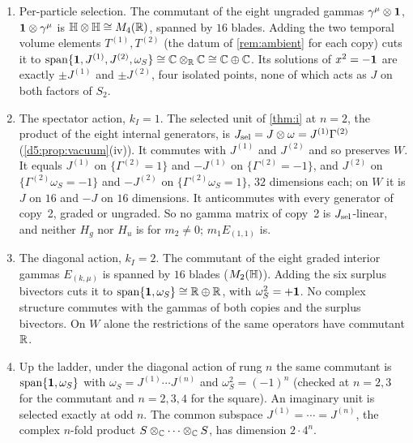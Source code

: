 \begin{proposition}
\label{e1:prop:select}
\begin{enumerate}[label=(\roman*),leftmargin=2.2em]
\item Per-particle selection. The commutant of the eight ungraded gammas $\gamma^\mu\otimes\mathbf 1$, $\mathbf 1\otimes\gamma^\mu$ is $\mathbb{H}\otimes\mathbb{H}\cong M_4(\mathbb{R})$,
spanned by $16$ blades. Adding the two temporal volume elements $T^{(1)},T^{(2)}$ (the datum of \cref{rem:ambient} for each copy)
cuts it to $\operatorname{span}\{\mathbf 1,J^{(1)},J^{(2)},\omega_S\}\cong\mathbb{C}\otimes_{\mathbb{R}}\mathbb{C}\cong\mathbb{C}\oplus\mathbb{C}$. Its solutions of $x^2=-\mathbf 1$ are exactly
$\pm J^{(1)}$ and $\pm J^{(2)}$, four isolated points, none of which acts as $J$ on both factors of $S_2$.
\item The spectator action, $k_I=1$. The selected unit of \cref{thm:i} at $n=2$, the product of the eight internal generators, is
$J_{\rm sel}=J\otimes\omega=J^{(1)}\Gamma^{(2)}$ (\cref{d5:prop:vacuum}(iv)). It commutes with $J^{(1)}$ and $J^{(2)}$ and so preserves
$W$. It equals $J^{(1)}$ on $\{\Gamma^{(2)}=1\}$ and $-J^{(1)}$ on $\{\Gamma^{(2)}=-1\}$, and $J^{(2)}$ on $\{\Gamma^{(2)}\omega_S=-1\}$ and
$-J^{(2)}$ on $\{\Gamma^{(2)}\omega_S=1\}$, $32$ dimensions each; on $W$ it is $J$ on $16$ and $-J$ on $16$ dimensions. It anticommutes with every generator of copy~2, graded or ungraded. So no gamma matrix of copy~2 is $J_{\rm sel}$-linear,
and neither $H_g$ nor $H_u$ is for $m_2\neq0$; $m_1E_{(1,1)}$ is.
\item The diagonal action, $k_I=2$. The commutant of the eight graded interior gammas $E_{(k,\mu)}$ is spanned by $16$ blades ($M_2(\mathbb{H})$). Adding
the six surplus bivectors cuts it to $\operatorname{span}\{\mathbf 1,\omega_S\}\cong\mathbb{R}\oplus\mathbb{R}$, with $\omega_S^2=+\mathbf 1$. No complex structure commutes with
the gammas of both copies and the surplus bivectors. On $W$ alone the restrictions of the same operators have commutant $\mathbb{R}$.
\item Up the ladder, under the diagonal action of rung $n$ the same commutant is $\operatorname{span}\{\mathbf 1,\omega_S\}$ with
$\omega_S=J^{(1)}\cdots J^{(n)}$ and $\omega_S^2=(-1)^n$ (checked at $n=2,3$ for the commutant and $n=2,3,4$ for the square). An imaginary unit
is selected exactly at odd $n$. The common subspace $J^{(1)}=\cdots=J^{(n)}$, the complex $n$-fold product $S\otimes_{\mathbb{C}}\cdots\otimes_{\mathbb{C}} S$, has
dimension $2\cdot4^n$.
\end{enumerate}
\end{proposition}

